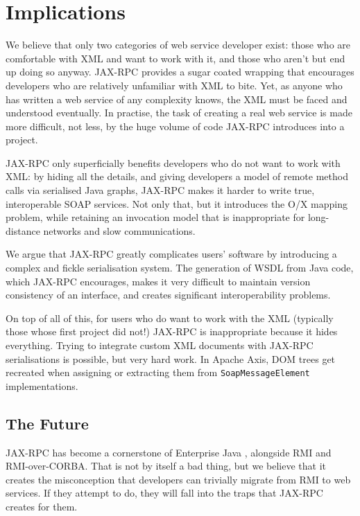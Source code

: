 \section{Implications}
\label{implications}

We believe that only two categories of web service developer exist:
those who are comfortable with XML and want to work with it, and those
who aren't but end up doing so anyway. JAX-RPC provides a sugar coated
wrapping that encourages developers who are relatively unfamiliar with
XML to bite. Yet, as anyone who has written a web service of any
complexity knows, the XML must be faced and understood eventually. In
practise, the task of creating a real web service is made more
difficult, not less, by the huge volume of code JAX-RPC introduces
into a project.

JAX-RPC only superficially benefits developers who do not want to work
with XML: by hiding all the details, and giving developers a model of
remote method calls via serialised Java graphs, JAX-RPC makes it
harder to write true, interoperable SOAP services. Not only that, but
it introduces the O/X mapping problem, while retaining an invocation
model that is inappropriate for long-distance networks and slow
communications.

We argue that JAX-RPC greatly complicates users' software by
introducing a complex and fickle serialisation system. The generation
of WSDL from Java code, which JAX-RPC encourages, makes it very
difficult to maintain version consistency of an interface, and
creates significant interoperability problems.

On top of all of this, for users who do want to work with the XML
(typically those whose first project did not!) JAX-RPC is
inappropriate because it hides everything. Trying to integrate custom
XML documents with JAX-RPC serialisations is possible, but very hard
work. In Apache Axis, DOM trees get recreated when assigning or
extracting them from {\tt SoapMessageElement} implementations.


\subsection{The Future}
\label{implications:future}

JAX-RPC has become a cornerstone of Enterprise Java
\cite{spec:J2EE-14}, alongside RMI and RMI-over-CORBA. That is not by
itself a bad thing, but we believe that it creates the misconception
that developers can trivially migrate from RMI to web services. If
they attempt to do, they will fall into the traps that JAX-RPC creates
for them.

